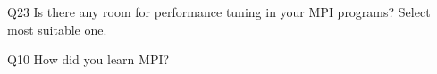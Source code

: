 \begin{description}%
\item{Q23} Is there any room for performance tuning in your MPI programs? Select most suitable one.%
\item{Q10} How did you learn MPI?%
\end{description}%

